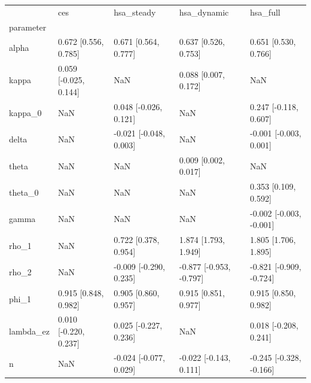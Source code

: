 \begin{tabular}{lllll}
\toprule
 & ces & hsa\_steady & hsa\_dynamic & hsa\_full \\
parameter &  &  &  &  \\
\midrule
alpha & 0.672 [0.556, 0.785] & 0.671 [0.564, 0.777] & 0.637 [0.526, 0.753] & 0.651 [0.530, 0.766] \\
kappa & 0.059 [-0.025, 0.144] & NaN & 0.088 [0.007, 0.172] & NaN \\
kappa\_0 & NaN & 0.048 [-0.026, 0.121] & NaN & 0.247 [-0.118, 0.607] \\
delta & NaN & -0.021 [-0.048, 0.003] & NaN & -0.001 [-0.003, 0.001] \\
theta & NaN & NaN & 0.009 [0.002, 0.017] & NaN \\
theta\_0 & NaN & NaN & NaN & 0.353 [0.109, 0.592] \\
gamma & NaN & NaN & NaN & -0.002 [-0.003, -0.001] \\
rho\_1 & NaN & 0.722 [0.378, 0.954] & 1.874 [1.793, 1.949] & 1.805 [1.706, 1.895] \\
rho\_2 & NaN & -0.009 [-0.290, 0.235] & -0.877 [-0.953, -0.797] & -0.821 [-0.909, -0.724] \\
phi\_1 & 0.915 [0.848, 0.982] & 0.905 [0.860, 0.957] & 0.915 [0.851, 0.977] & 0.915 [0.850, 0.982] \\
lambda\_ez & 0.010 [-0.220, 0.237] & 0.025 [-0.227, 0.236] & NaN & 0.018 [-0.208, 0.241] \\
n & NaN & -0.024 [-0.077, 0.029] & -0.022 [-0.143, 0.111] & -0.245 [-0.328, -0.166] \\
\bottomrule
\end{tabular}
